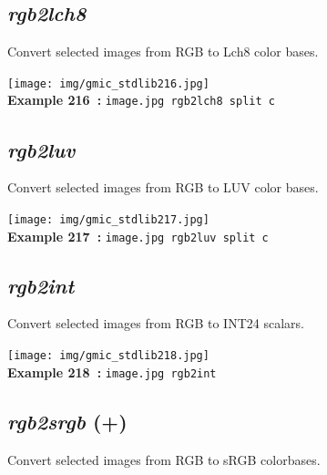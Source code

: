 \documentclass[a4paper,10.5pt,twoside]{book}
\begin{document}
\subsection{\emph{rgb2lch8} }\vspace*{-0.7em}
Convert selected images from RGB to Lch8 color bases.
\begin{center}\texttt{[image: img/gmic\_stdlib216.jpg]}\\
{\footnotesize \textbf{Example 216~:} \texttt{image.jpg rgb2lch8 split c}}
\end{center}

\subsection{\emph{rgb2luv} }\vspace*{-0.7em}
Convert selected images from RGB to LUV color bases.
\begin{center}\texttt{[image: img/gmic\_stdlib217.jpg]}\\
{\footnotesize \textbf{Example 217~:} \texttt{image.jpg rgb2luv split c}}
\end{center}

\subsection{\emph{rgb2int} }\vspace*{-0.7em}
Convert selected images from RGB to INT24 scalars.
\begin{center}\texttt{[image: img/gmic\_stdlib218.jpg]}\\
{\footnotesize \textbf{Example 218~:} \texttt{image.jpg rgb2int}}
\end{center}

\subsection{\emph{rgb2srgb} (+)}\vspace*{-0.7em}
Convert selected images from RGB to sRGB colorbases.
\end{document}
